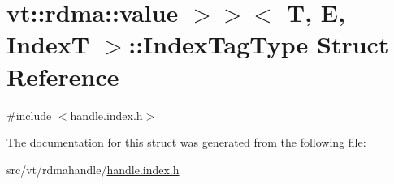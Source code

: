 \hypertarget{structvt_1_1rdma_1_1_handle_3_01_t_00_01_e_00_01_index_t_00_01typename_01std_1_1enable__if__t_3_1ceedd6f8d829061f3897a02dba9ce2d}{}\section{vt\+:\+:rdma\+:\+:value $>$$>$$<$ T, E, IndexT $>$\+:\+:Index\+Tag\+Type Struct Reference}
\label{structvt_1_1rdma_1_1_handle_3_01_t_00_01_e_00_01_index_t_00_01typename_01std_1_1enable__if__t_3_1ceedd6f8d829061f3897a02dba9ce2d}


{\ttfamily \#include $<$handle.\+index.\+h$>$}



The documentation for this struct was generated from the following file\+:\begin{DoxyCompactItemize}
\item 
src/vt/rdmahandle/\hyperlink{handle_8index_8h}{handle.\+index.\+h}\end{DoxyCompactItemize}
